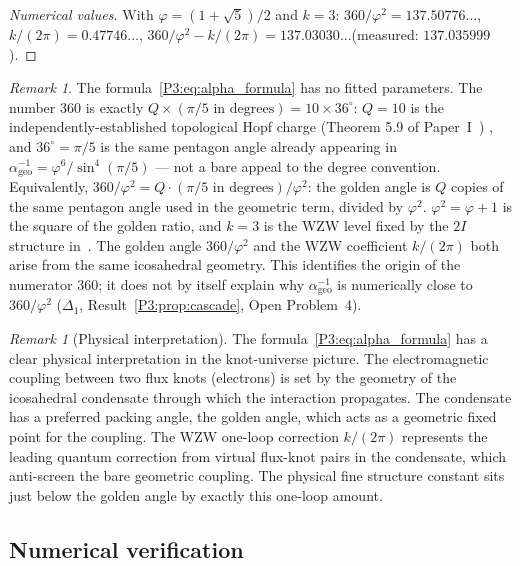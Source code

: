 \documentclass[11pt,a4paper]{article}
\theoremstyle{definition}
\theoremstyle{remark}
\newtheorem{remark}[theorem]{Remark}
\newcommand{\vp}{\varphi}
\newcommand{\aInv}{\alpha^{-1}}
\begin{document}
\begin{proof}[Numerical values]
With $\vp = (1+\sqrt{5})/2$ and $k=3$:
$360/\vp^2 = 137.50776\ldots$,\quad $k/(2\pi) = 0.47746\ldots$,\quad
$360/\vp^2 - k/(2\pi) = 137.03030\ldots$\quad(measured: $137.035999$).
\end{proof}

\begin{remark}
\label{P3:rem:no_fitted_params}
The formula~\eqref{P3:eq:alpha_formula} has no fitted parameters.
The number $360$ is exactly $Q\times(\pi/5\text{ in degrees}) = 10\times36^\circ$:
$Q=10$ is the independently-established topological Hopf charge
(Theorem 5.9 of Paper~I~\cite{Paper1})%
, and $36^\circ=\pi/5$ is the same
pentagon angle already appearing in $\aInv_{\mathrm{geo}}=\vp^6/\sin^4(\pi/5)$
--- not a bare appeal to the degree convention. Equivalently,
$360/\vp^2 = Q\cdot(\pi/5\text{ in degrees})/\vp^2$: the golden angle is
$Q$ copies of the same pentagon angle used in the geometric term, divided
by $\vp^2$. $\vp^2=\vp+1$ is the square of the golden ratio, and $k=3$
is the WZW level fixed by the $2I$ structure in~\cite{Paper1}.
The golden angle $360/\vp^2$ and the WZW coefficient $k/(2\pi)$
both arise from the same icosahedral geometry. This identifies the
origin of the numerator $360$; it does not by itself explain why
$\aInv_{\mathrm{geo}}$ is numerically close to $360/\vp^2$
($\Delta_1$, Result~\ref{P3:prop:cascade}, Open Problem~4).
\end{remark}

\begin{remark}[Physical interpretation]
\label{P3:rem:alpha_physical_interp}
The formula~\eqref{P3:eq:alpha_formula} has a clear physical
interpretation in the knot-universe picture.  The electromagnetic
coupling between two flux knots (electrons) is set by the geometry
of the icosahedral condensate through which the interaction propagates.
The condensate has a preferred packing angle, the golden angle,
which acts as a geometric fixed point for the coupling.  The WZW
one-loop correction $k/(2\pi)$ represents the leading quantum
correction from virtual flux-knot pairs in the condensate, which
anti-screen the bare geometric coupling.
The physical fine structure constant sits just below the golden angle
by exactly this one-loop amount.
\end{remark}

\subsection{Numerical verification}
\end{document}
